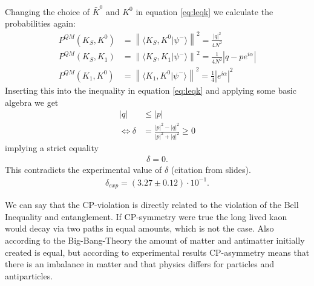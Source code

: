 \documentclass[a4paper]{article}
\begin{document}
Changing the choice of $\bar{K}^0$ and $K^0$ in equation \ref{eq:leqk} we
calculate the probabilities again:
\begin{align}
    P^{QM}(K_S, K^0)&=\left\|\langle K_S, K^0|\psi ^-\rangle\right\|
    ^2=\frac{|q|^2}{4N^2} \\
    P^{QM}(K_S, K_1)&= \left\|\langle K_S, K_1|\psi ^-\rangle\right\|^2=
    \frac{1}{4N^2}\left|q-pe^{i\alpha}\right|\\
    P^{QM}(K_1, K^0)&=\left\|\langle K_1, K^0|\psi ^-\rangle\right\| ^2=
    \frac{1}{4}|e^{i\alpha}|^2
\end{align}
Inserting this into the inequality in equation \ref{eq:leqk} and applying some
basic algebra we get
\begin{align}
    |q| &\leq |p|\\
    \Leftrightarrow \delta &= \frac{|p|^2 - |q|^2}{|p|^2+|q|^2} \geq 0
\end{align}
implying a strict equality
\begin{align}
        \delta = 0.
\end{align}
This contradicts the experimental value of $\delta$ (citation from slides).
\begin{align}
    \delta_{exp} = (3.27\pm 0.12)\cdot 10^{-1}.
\end{align}

We can say that the CP-violation is directly related to the violation of the
Bell Inequality and entanglement.
If CP-symmetry were true the long lived kaon would decay via two paths in equal
amounts, which is not the case. Also
according to the Big-Bang-Theory the amount
of matter and antimatter initially created is equal, but according to
experimental results CP-asymmetry means that there is an imbalance in
matter and that physics differs for particles and antiparticles.
\end{document}

